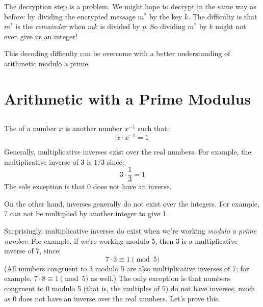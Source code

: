The decryption step is a problem.  We might hope to decrypt in the
same way as before: by dividing the encrypted message $m^*$ by the key
$k$.  The difficulty is that $m^*$ is the \emph{remainder} when $mk$
is divided by $p$.  So dividing $m^*$ by $k$ might not even give us an
integer!

This decoding difficulty can be overcome with a better understanding
of arithmetic modulo a prime.

\begin{problems}
\classproblems
{}
\end{problems}

\section{Arithmetic with a Prime Modulus}\label{mod_prime_sec}

\subsection{}
\label{sec:prime}

The  of a number $x$ is another number
$x^{-1}$ such that:
%
\[
x \cdot x^{-1} = 1
\]

Generally, multiplicative inverses exist over the real numbers.  For
example, the multiplicative inverse of 3 is $1 / 3$ since:
%
\[
3 \cdot \frac{1}{3} = 1
\]
%
The sole exception is that 0 does not have an inverse.

On the other hand, inverses generally do not exist over the integers.
For example, 7 can not be multiplied by another integer to give 1.

Surprisingly, multiplicative inverses do exist when we're working
\emph{modulo a prime number}.  For example, if we're working modulo
5, then 3 is a multiplicative inverse of 7, since:
%
\[
7 \cdot 3 \equiv 1 \pmod{5}
\]
%
(All numbers congruent to 3 modulo 5 are also multiplicative inverses
of 7; for example, $7 \cdot 8 \equiv 1 \pmod{5}$ as well.)  The only
exception is that numbers congruent to 0 modulo 5 (that is, the
multiples of 5) do not have inverses, much as 0 does not have an
inverse over the real numbers.  Let's prove this.

